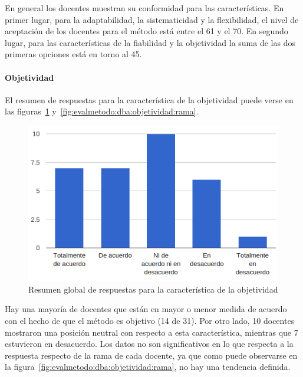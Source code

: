En general los docentes muestran su conformidad para las características. En primer lugar, para la adaptabilidad, la sistematicidad y la flexibilidad, el nivel de aceptación de los docentes para el método está entre el 61 y el 70\percentage. En segundo lugar, para las características de la fiabilidad y la objetividad la suma de las dos primeras opciones está en torno al 45\percentage.

\newpage
\paragraph*{Objetividad}

El resumen de respuestas para la característica de la objetividad puede verse en las figuras~\ref{fig:evalmetodo:dba:objetividad} y~\ref{fig:evalmetodo:dba:objetividad:rama}.

\begin{figure}[h]
  \begin{center}
    \includegraphics[scale=0.45]{C_DBA_objetividad.png}
  \end{center}
  \caption{Resumen global de respuestas para la característica de la objetividad}
  \label{fig:evalmetodo:dba:objetividad}
\end{figure}

Hay una mayoría de docentes que están en mayor o menor medida de acuerdo con el hecho de que el método es objetivo (14 de 31). Por otro lado, 10 docentes mostraron una posición neutral con respecto a esta característica, mientras que 7 estuvieron en desacuerdo. Los datos no son significativos en lo que respecta a la respuesta respecto de la rama de cada docente, ya que como puede observarse en la figura~\ref{fig:evalmetodo:dba:objetividad:rama}, no hay una tendencia definida.

